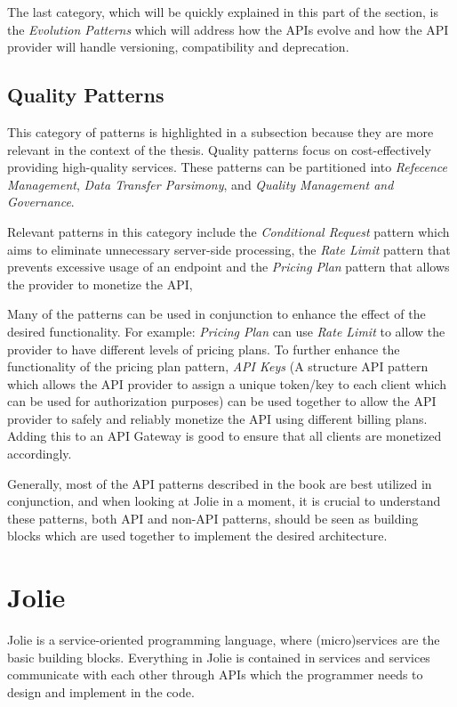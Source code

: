 The last category, which will be quickly explained in this part of the section, is the \textit{Evolution Patterns} which will address how the APIs evolve and how the API provider will handle versioning, compatibility and deprecation.

\subsection{Quality Patterns}
This category of patterns is highlighted in a subsection because they are more relevant in the context of the thesis. 
Quality patterns focus on cost-effectively providing high-quality services. These patterns can be partitioned into \textit{Refecence Management}, \textit{Data Transfer Parsimony}, and \textit{Quality Management and Governance}.

Relevant patterns in this category include the \textit{Conditional Request} pattern which aims to eliminate unnecessary server-side 
processing, the \textit{Rate Limit} pattern that prevents excessive usage of an endpoint and the \textit{Pricing Plan} pattern that allows the provider to monetize the API,

Many of the patterns can be used in conjunction to enhance the effect of the desired functionality. For example: \textit{Pricing Plan} can use \textit{Rate Limit} to allow the provider to have different levels of pricing plans.
To further enhance the functionality of the pricing plan pattern, \textit{API Keys} (A structure API pattern which allows the API provider
to assign a unique token/key to each client which can be used for authorization purposes) can be used together to allow the API provider to safely and reliably monetize the API using different billing plans. 
Adding this to an API Gateway is good to ensure that all clients are monetized accordingly.

Generally, most of the API patterns described in the book are best utilized in conjunction,
and when looking at Jolie in a moment, it is crucial to understand these patterns, both API and non-API patterns,
should be seen as building blocks which are used together to implement the desired architecture.

\section{Jolie}
Jolie is a service-oriented programming language, where (micro)services are the basic building blocks.
Everything in Jolie is contained in services and services communicate with each other through APIs which the programmer needs to design and implement in the code.

